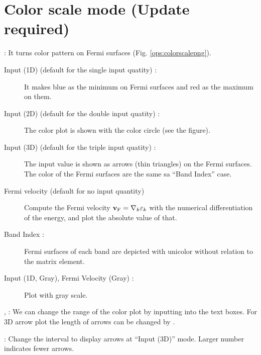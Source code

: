 \documentclass[letterpaper,10pt,pdftex,openany,english]{sphinxmanual}
\begin{document}
\section{Color scale mode (Update required)}
\label{\detokenize{ops:color-scale-mode-update-required}}
\sphinxAtStartPar
{} : It turns color pattern on Fermi surfaces (Fig. \ref{ops:colorscalepng}).
\begin{description}
\item[{Input (1D) (default for the single input quatity) :}] \leavevmode
\sphinxAtStartPar
It makes blue as the minimum on Fermi surfaces and red
as the maximum on them.

\item[{Input (2D) (default for the double input quatity) :}] \leavevmode
\sphinxAtStartPar
The color plot is shown with the color circle (see the figure).

\item[{Input (3D) (default for the triple input quatity) :}] \leavevmode
\sphinxAtStartPar
The input value is shown as arrows (thin triangles) on the Fermi surfaces.
The color of the Fermi surfaces are the same sa “Band Index” case.

\item[{Fermi velocity (default for no input quantity)}] \leavevmode
\sphinxAtStartPar
Compute the Fermi velocity \({\bf v}_{\rm F} = \nabla_k \varepsilon_k\)
with the numerical differentiation of the energy,
and plot the absolute value of that.

\item[{Band Index :}] \leavevmode
\sphinxAtStartPar
Fermi surfaces of each band are depicted with uni\sphinxhyphen{}color
without relation to the matrix element.

\item[{Input (1D, Gray), Fermi Velocity (Gray) :}] \leavevmode
\sphinxAtStartPar
Plot with gray scale.

\end{description}

\sphinxAtStartPar
{},  :
We can change the range of the color plot by inputting into the text boxes.
For 3D arrow plot the length of arrows can be changed by .

\sphinxAtStartPar
{} : Change the interval to display arrows at “Input (3D)” mode.
Larger number indicates fewer arrows.
\end{document}
